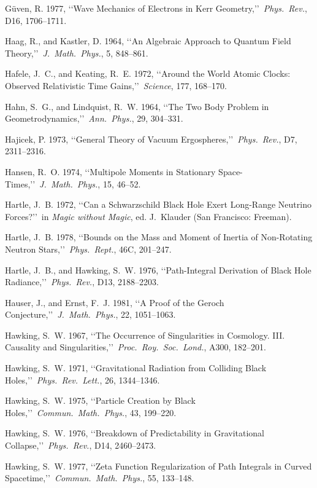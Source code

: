 \item G{\"u}ven, R. 1977, \lq\lq Wave Mechanics of Electrons in Kerr Geometry,\rq\rq\ \emph{Phys.\ Rev.}, D16, 1706--1711.
\item Haag, R., and Kastler, D. 1964, \lq\lq An Algebraic Approach to Quantum Field Theory,\rq\rq\ \emph{J.\ Math.\ Phys.}, 5, 848--861.
\item Hafele, J.~C., and Keating, R.~E. 1972, \lq\lq Around the World Atomic Clocks: Observed Relativistic Time Gains,\rq\rq\ \emph{Science}, 177, 168--170.
\item Hahn, S.~G., and Lindquist, R.~W. 1964, \lq\lq The Two Body Problem in Geometrodynamics,\rq\rq\ \emph{Ann.\ Phys.}, 29, 304--331.
\item Hajicek, P. 1973, \lq\lq General Theory of Vacuum Ergospheres,\rq\rq\ \emph{Phys.\ Rev.}, D7, 2311--2316.
\item Hansen, R.~O. 1974, \lq\lq Multipole Moments in Stationary Space-Times,\rq\rq\ \emph{J.\ Math.\ Phys.}, 15, 46--52.
\item Hartle, J.~B. 1972, \lq\lq Can a Schwarzschild Black Hole Exert Long-Range Neutrino Forces?\rq\rq\ in \emph{Magic without Magic}, ed. J.~Klauder (San Francisco: Freeman).
\item Hartle, J.~B. 1978, \lq\lq Bounds on the Mass and Moment of Inertia of Non-Rotating Neutron Stars,\rq\rq\ \emph{Phys.\ Rept.}, 46C, 201--247.
\item Hartle, J.~B., and Hawking, S.~W. 1976, \lq\lq Path-Integral Derivation of Black Hole Radiance,\rq\rq\ \emph{Phys.\ Rev.}, D13, 2188--2203.
\item Hauser, J., and Ernst, F.~J. 1981, \lq\lq A Proof of the Geroch Conjecture,\rq\rq\ \emph{J.\ Math.\ Phys.}, 22, 1051--1063.
\item Hawking, S.~W. 1967, \lq\lq The Occurrence of Singularities in Cosmology. III. Causality and Singularities,\rq\rq\ \emph{Proc.\ Roy.\ Soc.\ Lond.}, A300, 182--201.
\item Hawking, S.~W. 1971, \lq\lq Gravitational Radiation from Colliding Black Holes,\rq\rq\ \emph{Phys.\ Rev.\ Lett.}, 26, 1344--1346.
\item Hawking, S.~W. 1975, \lq\lq Particle Creation by Black Holes,\rq\rq\ \emph{Commun.\ Math.\ Phys.}, 43, 199--220.
\item Hawking, S.~W. 1976, \lq\lq Breakdown of Predictability in Gravitational Collapse,\rq\rq\ \emph{Phys.\ Rev.}, D14, 2460--2473.
\item Hawking, S.~W. 1977, \lq\lq Zeta Function Regularization of Path Integrals in Curved Spacetime,\rq\rq\ \emph{Commun.\ Math.\ Phys.}, 55, 133--148.
